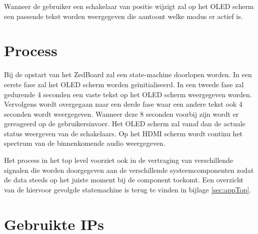 		\par Wanneer de gebruiker een schakelaar van positie wijzigt zal op het OLED scherm een passende tekst worden weergegeven die aantoont welke modus er actief is.


\section{Process}

	\par Bij de opstart van het ZedBoard zal een state-machine doorlopen worden. In een eerste fase zal het OLED scherm worden ge\"initialiseerd. In een tweede fase zal gedurende 4 seconden een vaste tekst op het OLED scherm weergegeven worden. Vervolgens wordt overgegaan naar een derde fase waar een andere tekst ook 4 seconden wordt weergegeven. Wanneer deze 8 seconden voorbij zijn wordt er gereageerd op de gebruikersinvoer. Het OLED scherm zal vanaf dan de actuale status weergeven van de schakelaars. Op het HDMI scherm wordt continu het spectrum van de binnenkomende audio weergegeven.

	\par Het process in het top level voorziet ook in de vertraging van verschillende signalen die worden doorgegeven aan de verschillende systeemcomponenten zodat de data steeds op het juiste moment bij de component toekomt. Een overzicht van de hiervoor gevolgde statemachine is terug te vinden in bijlage \ref{sec:appTop}.

\section{Gebruikte IPs}

